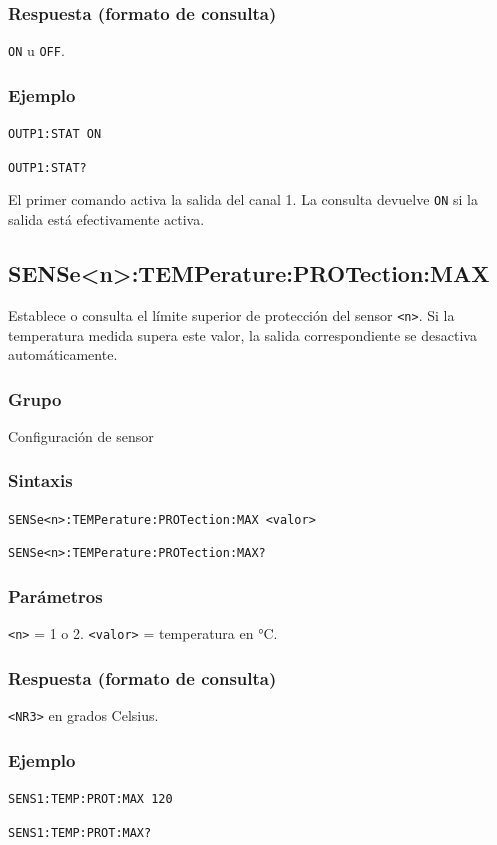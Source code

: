 \subsubsection*{Respuesta (formato de consulta)}
\texttt{ON} u \texttt{OFF}.

\subsubsection*{Ejemplo}
\texttt{OUTP1:STAT ON}\par
\texttt{OUTP1:STAT?}

El primer comando activa la salida del canal 1. La consulta devuelve \texttt{ON} si la salida está efectivamente activa.

\subsection*{SENSe<n>:TEMPerature:PROTection:MAX}

Establece o consulta el límite superior de protección del sensor \texttt{<n>}. Si la temperatura medida supera este valor, la salida correspondiente se desactiva automáticamente.

\subsubsection*{Grupo}
Configuración de sensor

\subsubsection*{Sintaxis}
\texttt{SENSe<n>:TEMPerature:PROTection:MAX <valor>}\par
\texttt{SENSe<n>:TEMPerature:PROTection:MAX?}

\subsubsection*{Parámetros}
\texttt{<n>} = 1 o 2. \texttt{<valor>} = temperatura en °C.

\subsubsection*{Respuesta (formato de consulta)}
\texttt{<NR3>} en grados Celsius.

\subsubsection*{Ejemplo}
\texttt{SENS1:TEMP:PROT:MAX 120}\par
\texttt{SENS1:TEMP:PROT:MAX?}

